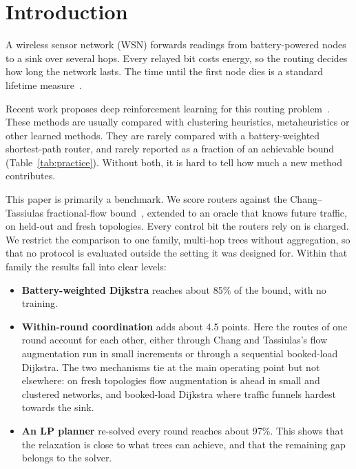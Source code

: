 \section{Introduction}\label{sec:intro}

A wireless sensor network (WSN) forwards readings from battery-powered nodes to a sink over several hops. Every relayed bit costs energy, so the routing decides how long the network lasts. The time until the first node dies is a standard lifetime measure~\cite{chang2004maximum}.

Recent work proposes deep reinforcement learning for this routing problem~\cite{yang2025madii,younus2021sdwsn}. These methods are usually compared with clustering heuristics, metaheuristics or other learned methods. They are rarely compared with a battery-weighted shortest-path router, and rarely reported as a fraction of an achievable bound (Table~\ref{tab:practice}). Without both, it is hard to tell how much a new method contributes.

This paper is primarily a benchmark. We score routers against the Chang--Tassiulas fractional-flow bound~\cite{chang2004maximum}, extended to an oracle that knows future traffic, on held-out and fresh topologies. Every control bit the routers rely on is charged. We restrict the comparison to one family, multi-hop trees without aggregation, so that no protocol is evaluated outside the setting it was designed for. Within that family the results fall into clear levels:
\begin{itemize}[leftmargin=*]
  \item \textbf{Battery-weighted Dijkstra} reaches about 85\% of the bound, with no training.
  \item \textbf{Within-round coordination} adds about 4.5 points. Here the routes of one round account for each other, either through Chang and Tassiulas's flow augmentation run in small increments or through a sequential booked-load Dijkstra. The two mechanisms tie at the main operating point but not elsewhere: on fresh topologies flow augmentation is ahead in small and clustered networks, and booked-load Dijkstra where traffic funnels hardest towards the sink.
  \item \textbf{An LP planner} re-solved every round reaches about 97\%. This shows that the relaxation is close to what trees can achieve, and that the remaining gap belongs to the solver.
\end{itemize}

